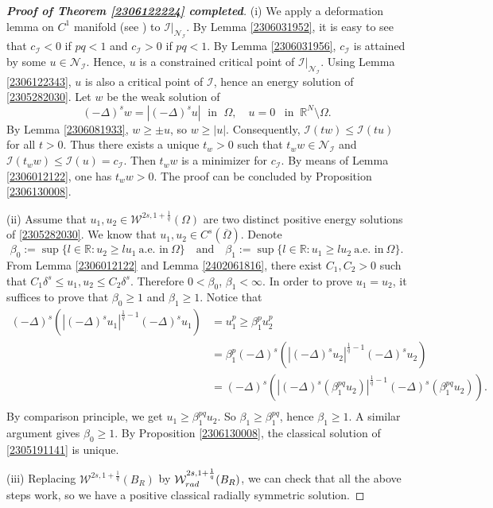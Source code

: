 \documentclass[10pt]{article}
\numberwithin{equation}{section}
\numberwithin{equation}{section}
\begin{document}
\begin{proof}[\bf Proof of Theorem \ref{2306122224} completed]
(i) We apply a deformation lemma on $C^1$ manifold (see \cite{Bonnet1993}) to $\mathcal{I}|_{\mathcal{N}_\mathcal{I}}$. By Lemma \ref{2306031952}, it is easy to see that $c_{\mathcal{I}}<0$ if $pq<1$ and $c_{\mathcal{I}}>0$ if $pq<1$. By Lemma \ref{2306031956}, $c_{\mathcal{I}}$ is attained by some $u\in \mathcal{N}_\mathcal{I}$. Hence, $u$ is a constrained critical point of $\mathcal{I}|_{\mathcal{N}_\mathcal{I}}$. Using Lemma \ref{2306122343}, $u$ is also a critical point of $\mathcal{I}$, hence an energy solution of \eqref{2305282030}. Let $w$ be the weak solution of
\[
(-\Delta)^{s} w =|(-\Delta)^{s}u| \; \text{ in }\;\Omega,\quad u=0~\;\text{ in} \;\;\mathbb{R}^N\setminus\Omega.
\]
By Lemma \ref{2306081933}, $w\ge \pm u$, so $w\ge |u|$. Consequently, $\mathcal{I}(tw)\le \mathcal{I}(tu)$ for all $t>0$. Thus there exists a unique $t_w>0$ such that $t_ww\in \mathcal{N}_\mathcal{I}$ and $\mathcal{I}(t_ww)\le  \mathcal{I}(u)=c_{\mathcal{I}}.$ Then $t_ww$ is a minimizer for $c_{\mathcal{I}}$. By means of Lemma \ref{2306012122}, one has $t_ww>0$. The proof can be concluded by Proposition \ref{2306130008}.

(ii) Assume that $u_1, u_2\in \mathcal{W}^{2s, 1+\frac1q}(\Omega)$ are two distinct positive energy solutions of \eqref{2305282030}. We know that $u_1, u_2\in C^s(\overline{\Omega})$. Denote
\[
\beta_0:=\sup\{l\in\mathbb{R}: u_2\ge lu_1 ~\text{a.e. in} ~\Omega \} \quad\text{and}\quad
\beta_1:=\sup\{l\in\mathbb{R}: u_1\ge lu_2 ~\text{a.e. in} ~\Omega \}.
\]
From Lemma \ref{2306012122} and Lemma \ref{2402061816}, there exist $C_1, C_2>0$ such that $C_1\delta^s\le u_1, u_2\le C_2\delta^s$. Therefore $0<\beta_0$, $\beta_1<\infty$. In order to prove $u_1=u_2$, it suffices to prove that $\beta_0 \ge1$ and $\beta_1\ge 1$. Notice that
\[
\begin{aligned}
(-\Delta)^{s}\left(|(-\Delta)^{s}u_1|^{\frac1q-1}(-\Delta)^{s}u_1\right)&=u_1^{p}\ge  \beta_1^{p} u_2^{p}\\
&=\beta_1^{p}(-\Delta)^{s}\left(|(-\Delta)^{s}u_2|^{\frac1q-1}(-\Delta)^{s}u_2\right)\\
&=(-\Delta)^{s}\left(|(-\Delta)^{s}(\beta_1^{pq}u_2)|^{\frac1q-1}(-\Delta)^{s}(\beta_1^{pq}u_2)\right).\\
\end{aligned}
\]
By comparison principle, we get $u_1\ge \beta_1^{pq}u_2$. So $\beta_1\ge\beta_1^{pq}$, hence $\beta_1\ge 1$. A similar argument gives $\beta_0\ge 1$. By Proposition \ref{2306130008}, the classical solution of \eqref{2305191141} is unique.

(iii) Replacing $\mathcal{W}^{2s, 1+\frac1q}(B_R)$ by $\mathcal{W}_{{\rm rad}}^{2s, 1+\frac1q}(B_R)$, we can check that all the above steps work, so we have a positive classical radially symmetric solution.
\end{proof}
\end{document}
